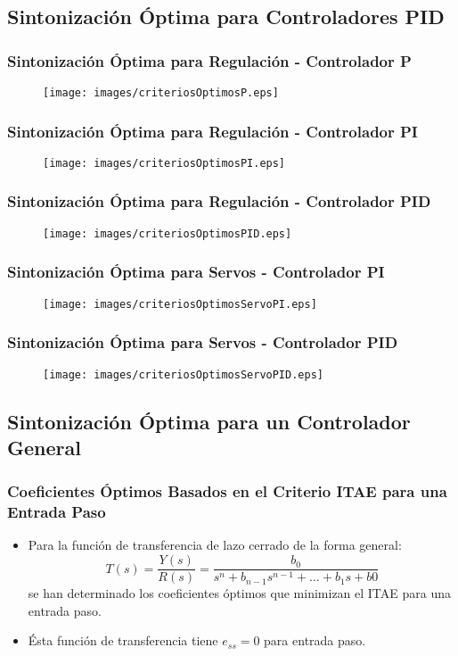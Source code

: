 \documentclass[aspectratio=169]{beamer}
\theoremstyle{definition}
\theoremstyle{plain}
\theoremstyle{remark}
\begin{document}
\subsection{Sintonización Óptima para Controladores PID}
\begin{frame}[<+->]\frametitle{Sintonización Óptima para Regulación - Controlador P}
\begin{figure}
	\texttt{[image: images/criteriosOptimosP.eps]}
\end{figure}
\end{frame}

\begin{frame}[<+->]\frametitle{Sintonización Óptima para Regulación - Controlador PI}
\begin{figure}
	\texttt{[image: images/criteriosOptimosPI.eps]}
\end{figure}
\end{frame}

\begin{frame}[<+->]\frametitle{Sintonización Óptima para Regulación - Controlador PID}
\begin{figure}
	\texttt{[image: images/criteriosOptimosPID.eps]}
\end{figure}
\end{frame}

\begin{frame}[<+->]\frametitle{Sintonización Óptima para Servos - Controlador PI}
\begin{figure}
	\texttt{[image: images/criteriosOptimosServoPI.eps]}
\end{figure}
\end{frame}

\begin{frame}[<+->]\frametitle{Sintonización Óptima para Servos - Controlador PID}
\begin{figure}
	\texttt{[image: images/criteriosOptimosServoPID.eps]}
\end{figure}
\end{frame}

\subsection{Sintonización Óptima para un Controlador General}
\begin{frame}[<+->]\frametitle{Coeficientes Óptimos Basados en el Criterio ITAE para una Entrada Paso}
\begin{itemize}
	\item Para la función de transferencia de lazo cerrado de la forma general:
	\begin{equation*}
		T(s) = \frac{Y(s)}{R(s)} = \frac{b_0}{s^n + b_{n-1} s^{n-1} + \dots + b_1 s + b0}
	\end{equation*}
	se han determinado los coeficientes óptimos que minimizan el ITAE para una entrada paso.
	\item Ésta función de transferencia tiene $e_{ss} = 0$ para entrada paso.
\end{itemize}
\end{frame}
\end{document}
